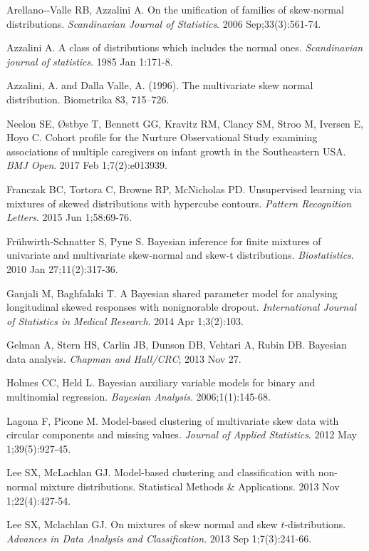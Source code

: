 \documentclass[useAMS,referee]{biom}
\begin{document}
\begin{thebibliography}{}

\bibitem{ } Arellano‐-Valle RB, Azzalini A. On the unification of families of skew‐normal distributions. \textit{Scandinavian Journal of Statistics}. 2006 Sep;33(3):561-74.

\bibitem{ } Azzalini A. A class of distributions which includes the normal ones. \textit{Scandinavian journal of statistics}. 1985 Jan 1:171-8.

\bibitem{ } Azzalini, A. and Dalla Valle, A. (1996). The multivariate skew normal distribution. Biometrika 83, 715–726.

\bibitem{ } Neelon SE, \O stbye T, Bennett GG, Kravitz RM, Clancy SM, Stroo M, Iversen E, Hoyo C. Cohort profile for the Nurture Observational Study examining associations of multiple caregivers on infant growth in the Southeastern USA. \textit{BMJ Open}. 2017 Feb 1;7(2):e013939.

\bibitem{ } Franczak BC, Tortora C, Browne RP, McNicholas PD. Unsupervised learning via mixtures of skewed distributions with hypercube contours. \textit{Pattern Recognition Letters}. 2015 Jun 1;58:69-76.

\bibitem{ } Fr\"{u}hwirth-Schnatter S, Pyne S. Bayesian inference for finite mixtures of univariate and multivariate skew-normal and skew-t distributions. \textit{Biostatistics}. 2010 Jan 27;11(2):317-36.

\bibitem{ } Ganjali M, Baghfalaki T. A Bayesian shared parameter model for analysing longitudinal skewed responses with nonignorable dropout. \textit{International Journal of Statistics in Medical Research}. 2014 Apr 1;3(2):103.

\bibitem{ } Gelman A, Stern HS, Carlin JB, Dunson DB, Vehtari A, Rubin DB. Bayesian data analysis. \textit{Chapman and Hall/CRC}; 2013 Nov 27.

\bibitem{ } Holmes CC, Held L. Bayesian auxiliary variable models for binary and multinomial regression. \textit{Bayesian Analysis}. 2006;1(1):145-68.

\bibitem{ } Lagona F, Picone M. Model-based clustering of multivariate skew data with circular components and missing values. \textit{Journal of Applied Statistics}. 2012 May 1;39(5):927-45.

\bibitem{ } Lee SX, McLachlan GJ. Model-based clustering and classification with non-normal mixture distributions. Statistical Methods \& Applications. 2013 Nov 1;22(4):427-54.

\bibitem{ } Lee SX, Mclachlan GJ. On mixtures of skew normal and skew $t$-distributions. \textit{Advances in Data Analysis and Classification}. 2013 Sep 1;7(3):241-66.


\end{thebibliography}
\end{document}
